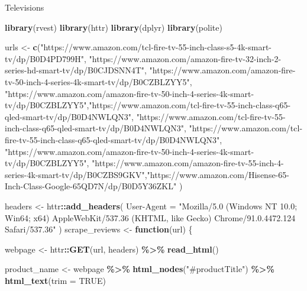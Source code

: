 \documentclass[
  11pt,
]{article}
\newenvironment{Shaded}{\begin{snugshade}}{\end{snugshade}}
\newcommand{\AttributeTok}[1]{\textcolor[rgb]{0.13,0.29,0.53}{#1}}
\newcommand{\ConstantTok}[1]{\textcolor[rgb]{0.56,0.35,0.01}{#1}}
\newcommand{\ControlFlowTok}[1]{\textcolor[rgb]{0.13,0.29,0.53}{\textbf{#1}}}
\newcommand{\FunctionTok}[1]{\textcolor[rgb]{0.13,0.29,0.53}{\textbf{#1}}}
\newcommand{\NormalTok}[1]{#1}
\newcommand{\OtherTok}[1]{\textcolor[rgb]{0.56,0.35,0.01}{#1}}
\newcommand{\SpecialCharTok}[1]{\textcolor[rgb]{0.81,0.36,0.00}{\textbf{#1}}}
\newcommand{\StringTok}[1]{\textcolor[rgb]{0.31,0.60,0.02}{#1}}
\begin{document}
Televisions

\begin{Shaded}
\begin{Highlighting}[]
\FunctionTok{library}\NormalTok{(rvest)}
\FunctionTok{library}\NormalTok{(httr)}
\FunctionTok{library}\NormalTok{(dplyr)}
\FunctionTok{library}\NormalTok{(polite)}

\NormalTok{urls }\OtherTok{\textless{}{-}} \FunctionTok{c}\NormalTok{(}\StringTok{"https://www.amazon.com/tcl{-}fire{-}tv{-}55{-}inch{-}class{-}s5{-}4k{-}smart{-}tv/dp/B0D4PD799H"}\NormalTok{, }\StringTok{"https://www.amazon.com/amazon{-}fire{-}tv{-}32{-}inch{-}2{-}series{-}hd{-}smart{-}tv/dp/B0CJDSNN4T"}\NormalTok{, }\StringTok{"https://www.amazon.com/amazon{-}fire{-}tv{-}50{-}inch{-}4{-}series{-}4k{-}smart{-}tv/dp/B0CZBLZYY5"}\NormalTok{, }\StringTok{"https://www.amazon.com/amazon{-}fire{-}tv{-}50{-}inch{-}4{-}series{-}4k{-}smart{-}tv/dp/B0CZBLZYY5"}\NormalTok{,}\StringTok{"https://www.amazon.com/tcl{-}fire{-}tv{-}55{-}inch{-}class{-}q65{-}qled{-}smart{-}tv/dp/B0D4NWLQN3"}\NormalTok{, }\StringTok{"https://www.amazon.com/tcl{-}fire{-}tv{-}55{-}inch{-}class{-}q65{-}qled{-}smart{-}tv/dp/B0D4NWLQN3"}\NormalTok{, }\StringTok{"https://www.amazon.com/tcl{-}fire{-}tv{-}55{-}inch{-}class{-}q65{-}qled{-}smart{-}tv/dp/B0D4NWLQN3"}\NormalTok{, }\StringTok{"https://www.amazon.com/amazon{-}fire{-}tv{-}50{-}inch{-}4{-}series{-}4k{-}smart{-}tv/dp/B0CZBLZYY5"}\NormalTok{, }\StringTok{"https://www.amazon.com/amazon{-}fire{-}tv{-}55{-}inch{-}4{-}series{-}4k{-}smart{-}tv/dp/B0CZBS9GKV"}\NormalTok{,}\StringTok{"https://www.amazon.com/Hisense{-}65{-}Inch{-}Class{-}Google{-}65QD7N/dp/B0D5Y36ZKL"}
\NormalTok{          )}

\NormalTok{headers }\OtherTok{\textless{}{-}}\NormalTok{ httr}\SpecialCharTok{::}\FunctionTok{add\_headers}\NormalTok{(}
  \StringTok{\textasciigrave{}}\AttributeTok{User{-}Agent}\StringTok{\textasciigrave{}} \OtherTok{=} \StringTok{"Mozilla/5.0 (Windows NT 10.0; Win64; x64) AppleWebKit/537.36 (KHTML, like Gecko) Chrome/91.0.4472.124 Safari/537.36"}
\NormalTok{)}
\NormalTok{scrape\_reviews }\OtherTok{\textless{}{-}} \ControlFlowTok{function}\NormalTok{(url) \{}
  
\NormalTok{  webpage }\OtherTok{\textless{}{-}}\NormalTok{ httr}\SpecialCharTok{::}\FunctionTok{GET}\NormalTok{(url, headers) }\SpecialCharTok{\%\textgreater{}\%} \FunctionTok{read\_html}\NormalTok{()}

  
\NormalTok{  product\_name }\OtherTok{\textless{}{-}}\NormalTok{ webpage }\SpecialCharTok{\%\textgreater{}\%}
    \FunctionTok{html\_nodes}\NormalTok{(}\StringTok{"\#productTitle"}\NormalTok{) }\SpecialCharTok{\%\textgreater{}\%}
    \FunctionTok{html\_text}\NormalTok{(}\AttributeTok{trim =} \ConstantTok{TRUE}\NormalTok{)}
  

\end{Highlighting}
\end{Shaded}
\end{document}
